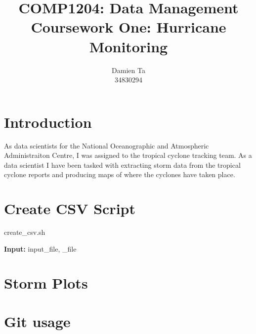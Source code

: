\documentclass[]{article}
\title{COMP1204: Data Management \\ Coursework One: Hurricane Monitoring }
\author{Damien Ta \\ 34830294}
\begin{document}
\maketitle

\section{Introduction}
As data scientists for the National Oceanographic and Atmospheric Administraiton Centre, I was assigned to the tropical cyclone
tracking team. As a data scientist I have been tasked with extracting storm data from the tropical cyclone reports and producing
maps of where the cyclones have taken place.
\section{Create CSV Script}
\begin{algorithm}
    \caption{create\_csv.sh}
    \begin{algorithmic}
        \STATE \textbf{Input:} input\_file, \_file
    \end{algorithmic}
\end{algorithm}
\section{Storm Plots}

\section{Git usage}
\end{document}
